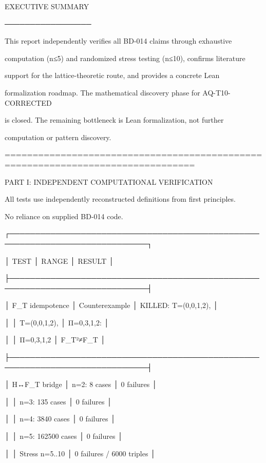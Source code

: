 EXECUTIVE SUMMARY

─────────────────

This report independently verifies all BD-014 claims through exhaustive

computation (n≤5) and randomized stress testing (n≤10), confirms literature

support for the lattice-theoretic route, and provides a concrete Lean

formalization roadmap. The mathematical discovery phase for AQ-T10-CORRECTED

is closed. The remaining bottleneck is Lean formalization, not further

computation or pattern discovery.


================================================================================

PART I: INDEPENDENT COMPUTATIONAL VERIFICATION


All tests use independently reconstructed definitions from first principles.

No reliance on supplied BD-014 code.


┌─────────────────────────────────────────────────────────────────────────────┐

│ TEST                    │ RANGE              │ RESULT                        │

├─────────────────────────────────────────────────────────────────────────────┤

│ F_T idempotence         │ Counterexample     │ KILLED: T=(0,0,1,2),         │

│                         │ T=(0,0,1,2),       │ Π={{0,3},{1},{2}}:           │

│                         │ Π={{0,3},{1},{2}}  │ F_T²≠F_T                     │

├─────────────────────────────────────────────────────────────────────────────┤

│ H↔F_T bridge            │ n=2: 8 cases       │ 0 failures                   │

│                         │ n=3: 135 cases     │ 0 failures                   │

│                         │ n=4: 3840 cases    │ 0 failures                   │

│                         │ n=5: 162500 cases  │ 0 failures                   │

│                         │ Stress n=5..10     │ 0 failures / 6000 triples    │

